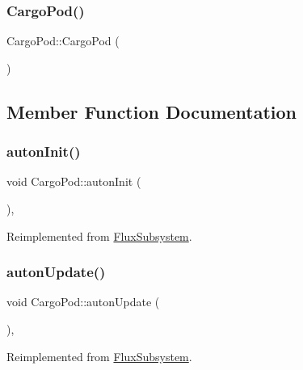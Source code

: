 \subsubsection{\texorpdfstring{Cargo\+Pod()}{CargoPod()}}
{\footnotesize\ttfamily Cargo\+Pod\+::\+Cargo\+Pod (\begin{DoxyParamCaption}{ }\end{DoxyParamCaption})}



\subsection{Member Function Documentation}
\mbox{\label{classCargoPod_a070623c3e9ca5b91765d68b63ccfa1eb}} 
\subsubsection{\texorpdfstring{auton\+Init()}{autonInit()}}
{\footnotesize\ttfamily void Cargo\+Pod\+::auton\+Init (\begin{DoxyParamCaption}{ }\end{DoxyParamCaption})\hspace{0.3cm}{\ttfamily [override]}, {\ttfamily [virtual]}}



Reimplemented from \hyperlink{classFluxSubsystem_a142cb34f612412e26bd0049e037dbe60}{Flux\+Subsystem}.

\mbox{\label{classCargoPod_ad11b20da5e057212dedd7a5ef34223b9}} 
\subsubsection{\texorpdfstring{auton\+Update()}{autonUpdate()}}
{\footnotesize\ttfamily void Cargo\+Pod\+::auton\+Update (\begin{DoxyParamCaption}{ }\end{DoxyParamCaption})\hspace{0.3cm}{\ttfamily [override]}, {\ttfamily [virtual]}}



Reimplemented from \hyperlink{classFluxSubsystem_aceed900af22503022b8d1278f3693f77}{Flux\+Subsystem}.


